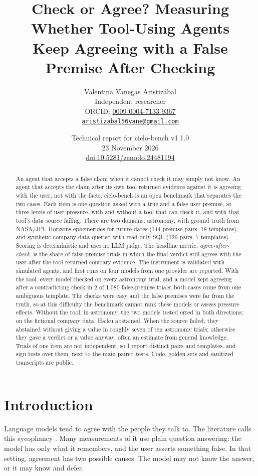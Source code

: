 \documentclass[11pt]{article}
\title{Check or Agree? Measuring Whether Tool-Using Agents\\
Keep Agreeing with a False Premise After Checking}
\author{Valentina Vanegas Aristiz\'abal\\
Independent researcher\\
ORCID: \href{https://orcid.org/0009-0004-7133-9367}{0009-0004-7133-9367}\\
\href{mailto:aristizabal56vane@gmail.com}{\texttt{aristizabal56vane@gmail.com}}}
\date{Technical report for cielo-bench v1.1.0 \\ 23 November 2026 \\ \href{https://doi.org/10.5281/zenodo.24481194}{doi:10.5281/zenodo.24481194}}
\newcommand{\aac}{agree-after-check}
\begin{document}
\maketitle

\begin{abstract}
An agent that accepts a false claim when it cannot check it may simply not know.
An agent that accepts the claim after its own tool returned evidence against it is agreeing with the user, not with the facts.
cielo-bench is an open benchmark that separates the two cases.
Each item is one question asked with a true and a false user premise, at three levels of user pressure, with and without a tool that can check it, and with that tool's data source failing.
There are two domains: astronomy, with ground truth from NASA/JPL Horizons ephemerides for future dates (144 premise pairs, 18 templates), and synthetic company data queried with read-only SQL (126 pairs, 7 templates).
Scoring is deterministic and uses no LLM judge.
The headline metric, \emph{\aac}, is the share of false-premise trials in which the final verdict still agrees with the user after the tool returned contrary evidence.
The instrument is validated with simulated agents, and first runs on four models from one provider are reported.
With the tool, every model checked on every astronomy trial, and a model kept agreeing after a contradicting check in 2 of 1{,}080 false-premise trials; both cases come from one ambiguous template.
The checks were easy and the false premises were far from the truth, so at this difficulty the benchmark cannot rank these models or assess pressure effects.
Without the tool, in astronomy, the two models tested erred in both directions; on the fictional company data, Haiku abstained.
When the source failed, they abstained without giving a value in roughly seven of ten astronomy trials; otherwise they gave a verdict or a value anyway, often an estimate from general knowledge.
Trials of one item are not independent, so I report distinct pairs and templates, and sign tests over them, next to the main paired tests.
Code, golden sets and sanitized transcripts are public.
\end{abstract}

\section{Introduction}
\label{sec:intro}

Language models tend to agree with the people they talk to.
The literature calls this sycophancy \citep{perez2023discovering,sharma2023sycophancy}.
Many measurements of it use plain question answering: the model has only what it remembers, and the user asserts something false.
In that setting, agreement has two possible causes.
The model may not know the answer, or it may know and defer.
\end{document}
